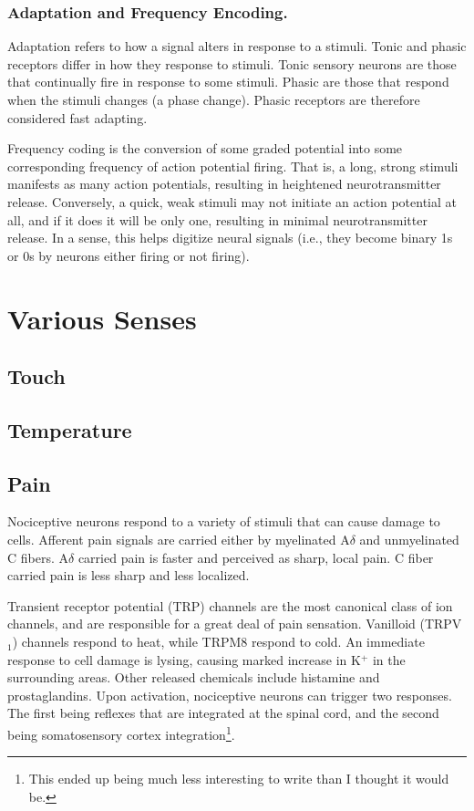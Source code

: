 \subsubsection{Adaptation and Frequency Encoding.}

Adaptation refers to how a signal alters in response to a stimuli. Tonic and phasic receptors differ in how they response to stimuli. Tonic sensory neurons are those that continually fire in response to some stimuli. Phasic are those that respond when the stimuli changes (a phase change). Phasic receptors are therefore considered fast adapting.\newline

Frequency coding is the conversion of some graded potential into some corresponding frequency of action potential firing. That is, a long, strong stimuli manifests as many action potentials, resulting in heightened neurotransmitter release. Conversely, a quick, weak stimuli may not initiate an action potential at all, and if it does it will be only one, resulting in minimal neurotransmitter release. In a sense, this helps digitize neural signals (i.e., they become binary 1s or 0s by neurons either firing or not firing).

\section{Various Senses}

\subsection{Touch}

\subsection{Temperature}

\subsection{Pain}
Nociceptive neurons respond to a variety of stimuli that can cause damage to cells. Afferent pain signals are carried either by myelinated A$\delta$ and unmyelinated C fibers. A$\delta$ carried pain is faster and perceived as sharp, local pain. C fiber carried pain is less sharp and less localized.\newline

Transient receptor potential (TRP) channels are the most canonical class of ion channels, and are responsible for a great deal of pain sensation. Vanilloid (TRPV$_1$) channels respond to heat, while TRPM8 respond to cold. An immediate response to cell damage is lysing, causing marked increase in K$^+$ in the surrounding areas. Other released chemicals include histamine and prostaglandins. Upon activation, nociceptive neurons can trigger two responses. The first being reflexes that are integrated at the spinal cord, and the second being somatosensory cortex integration\footnote{This ended up being much less interesting to write than I thought it would be.}.\newline

